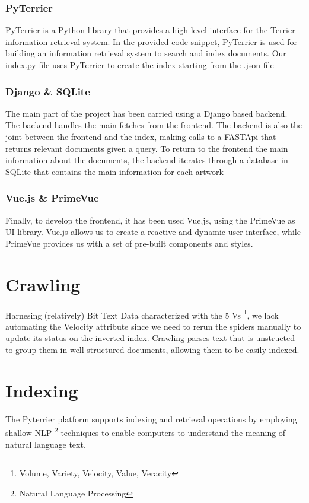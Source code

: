 \documentclass[12pt]{spieman}  %
\begin{document}
\begin{spacing}{1}
    \subsubsection{PyTerrier}
    PyTerrier is a Python library that provides a high-level interface for the Terrier information retrieval system. In the provided code snippet, PyTerrier is used for building an information retrieval system to search and index documents.\newline
    Our index.py file uses PyTerrier to create the index starting from the .json file

    \subsubsection{Django \& SQLite}
    The main part of the project has been carried using a Django based backend. The backend handles the main fetches from the frontend.
    The backend is also the joint between the frontend and the index, making calls to a FASTApi that returns relevant documents given a query.\newline
    To return to the frontend the main information about the documents, the backend iterates through a database in SQLite that contains the main information for each artwork

    \subsubsection{Vue.js \& PrimeVue}
    Finally, to develop the frontend, it has been used Vue.js, using the PrimeVue as UI library. Vue.js allows us to create a reactive and dynamic user interface, while PrimeVue provides us with a set of pre-built components and styles.

    \section{Crawling}\label{sec:crawling}
    Harnesing (relatively) Bit Text Data characterized with the 5
    Vs \footnote{Volume, Variety, Velocity, Value, Veracity},
    we lack automating the Velocity attribute since we need to rerun the spiders manually to update its
    status on the inverted index.
    Crawling parses text that is unstructed to group them in well-structured documents, allowing them to be
    easily indexed.

    \section{Indexing}\label{sec:indexing}
    The Pyterrier platform supports indexing and retrieval operations by employing shallow
    NLP \footnote{Natural Language Processing}
    techniques to enable computers to understand the meaning of natural language text.


\end{spacing}
\end{document}
